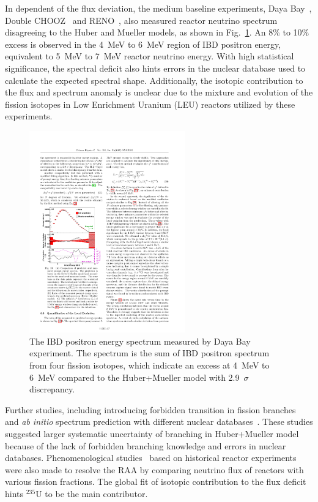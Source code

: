     In dependent of the flux deviation, the medium baseline experiments, Daya Bay~\cite{bib:DYBSpectrum}, Double CHOOZ~\cite{bib:DBChooz} and RENO~\cite{bib:RENO}, also measured reactor neutrino spectrum disagreeing to the Huber and Mueller models, as shown in Fig.~\ref{fig:DYBSpectrum}.
    An 8\% to 10\% excess is observed in the 4~MeV to 6~MeV region of IBD positron energy, equivalent to 5~MeV to 7~MeV reactor neutrino energy.
    With high statistical significance, the spectral deficit also hints errors in the nuclear database used to calculate the expected spectral shape.
    Additionally, the isotopic contribution to the flux and spectrum anomaly is unclear due to the mixture and evolution of the fission isotopes in Low Enrichment Uranium (LEU) reactors utilized by these experiments.
 \begin{figure}[h!]
    \centering
    \includegraphics[width=0.6\textwidth]{Figures/DYBSpectrum.pdf}
    \caption[Daya Bay IBD positron energy spectrum]{The IBD positron energy spectrum measured by Daya Bay experiment.
    The spectrum is the sum of IBD positron spectrum from four fission isotopes, which indicate an excess at 4~MeV to 6~MeV compared to the Huber+Mueller model with 2.9~$\sigma$ discrepancy.}
    \label{fig:DYBSpectrum}
    
\end{figure} 
    

    Further studies, including introducing forbidden transition in fission branches~\cite{bib:hayes} and \textit{ab initio} spectrum prediction with different nuclear databases~\cite{bib:dywer}.
    These studies suggested larger systematic uncertainty of branching in Huber+Mueller model because of the lack of forbidden branching knowledge and errors in nuclear databases.
    Phenomenological studies~\cite{bib:giunti2019} based on historical reactor experiments were also made to resolve the RAA by comparing neutrino flux of reactors with various fission fractions.
    The global fit of isotopic contribution to the flux deficit hints $^{235}$U to be the main contributor. 
    
